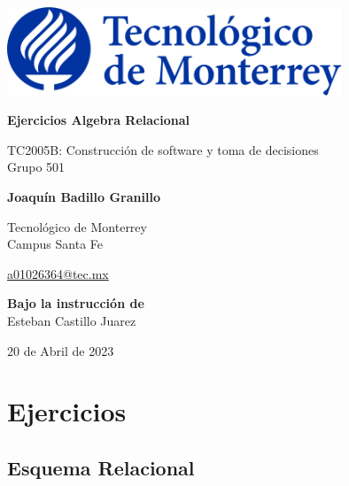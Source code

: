 \documentclass[a4paper, twoside, 12pt]{article}
\begin{document}
\begin{titlepage}
\begin{center}
		\includegraphics[width=0.75\textwidth]{Img/logo.png}
		
		\vspace{20pt}
		
		\begin{LARGE}\bf{Ejercicios Algebra Relacional}
		\end{LARGE}
		
		\vspace{30pt}

		TC2005B: Construcción de software y toma de decisiones \\
		Grupo 501\\
		
		\vspace{60pt}
  
            \textbf{Joaquín Badillo Granillo}
            
            Tecnológico de Monterrey\\ Campus Santa Fe
            
            \href{mailto:a01026364@tec.mx}{a01026364@tec.mx}

            
            
        
		\vspace{60pt}
		
		\textbf{Bajo la instrucción de} \\

        Esteban Castillo Juarez  
    		
		\vspace{60pt}
		
		20 de Abril de 2023
	\end{center}
\end{titlepage}
\pagebreak

\section*{Ejercicios}

\subsection*{Esquema Relacional}
\end{document}
